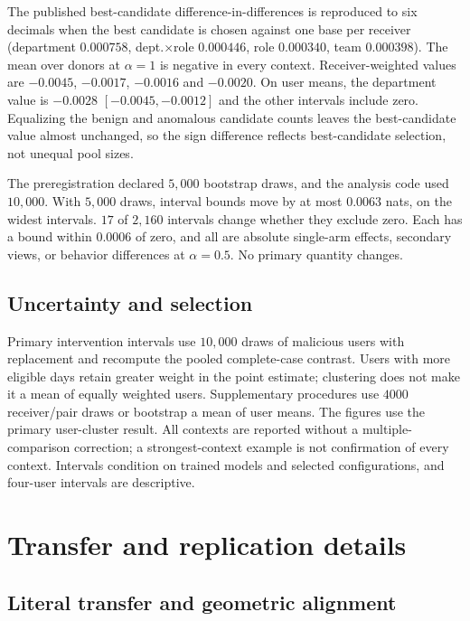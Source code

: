 The published best-candidate difference-in-differences is reproduced to six
decimals when the best candidate is chosen against one base per receiver
(department $0.000758$, dept.$\times$role $0.000446$, role $0.000340$, team
$0.000398$). The mean over donors at $\alpha{=}1$ is negative in every
context. Receiver-weighted values are $-0.0045$, $-0.0017$, $-0.0016$ and
$-0.0020$. On user means, the department value is $-0.0028$
$[-0.0045, -0.0012]$ and the other intervals include zero. Equalizing the
benign and anomalous candidate counts leaves the best-candidate value almost
unchanged, so the sign difference reflects best-candidate selection, not
unequal pool sizes.

The preregistration declared $5{,}000$ bootstrap draws, and the analysis code
used $10{,}000$. With $5{,}000$ draws, interval bounds move by at most
$0.0063$ nats, on the widest intervals. $17$ of $2{,}160$ intervals change
whether they exclude zero. Each has a bound within $0.0006$ of zero, and all
are absolute single-arm effects, secondary views, or behavior differences at
$\alpha{=}0.5$. No primary quantity changes.

\subsection{Uncertainty and selection}

Primary intervention intervals use $10{,}000$ draws of malicious users
with replacement and recompute the pooled complete-case contrast.
Users with more eligible days retain greater weight in the point
estimate; clustering does not make it a mean of equally weighted users.
Supplementary procedures use $4000$ receiver/pair draws or bootstrap a
mean of user means. The figures use the primary user-cluster result.
All contexts are reported without a multiple-comparison correction;
a strongest-context example is not confirmation of every context.
Intervals condition on trained models and selected configurations,
and four-user intervals are descriptive.

\section{Transfer and replication details}
\label{app:robustness}

\subsection{Literal transfer and geometric alignment}
\label{app:transfer}

